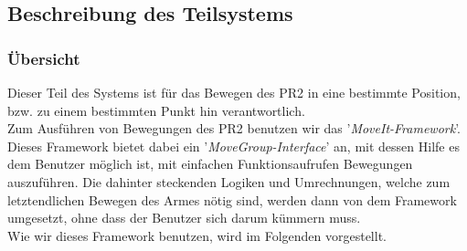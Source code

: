 \documentclass{suturo}
\begin{document}
\subsection{Beschreibung des Teilsystems}
\subsubsection{Übersicht}
Dieser Teil des Systems ist für das Bewegen des PR2 in eine bestimmte Position, bzw. zu einem bestimmten Punkt hin verantwortlich.\\
Zum Ausführen von Bewegungen des PR2 benutzen wir das '\textit{MoveIt-Framework}'. Dieses Framework bietet dabei ein '\textit{MoveGroup-Interface}' an, mit dessen Hilfe es dem Benutzer möglich ist, mit einfachen Funktionsaufrufen Bewegungen auszuführen. Die dahinter steckenden Logiken und Umrechnungen, welche zum letztendlichen Bewegen des Armes nötig sind, werden dann von dem Framework umgesetzt, ohne dass der Benutzer sich darum kümmern muss.\\
Wie wir dieses Framework benutzen, wird im Folgenden vorgestellt.
\end{document}
